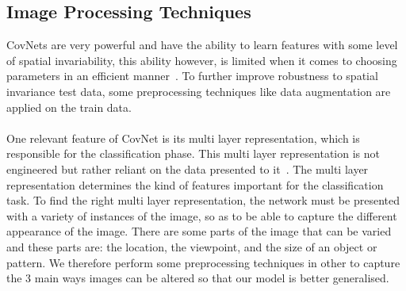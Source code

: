 \documentclass[12pt, a4paper,oneside]{report}
\begin{document}
\subsection{Image Processing Techniques}
CovNets are very powerful and have the ability to learn features with some level of spatial invariability, this ability however, is limited when it comes to choosing parameters in an efficient manner~\cite{jaderberg2015spatial}. To further improve robustness to spatial invariance test data, some preprocessing techniques like data augmentation are applied on the train data.\\ \\ One relevant feature of CovNet is its multi layer representation, which is responsible for the classification phase. This multi layer representation is not engineered but rather reliant on the data presented to it~\cite{van2017learning}. The multi layer representation determines the kind of features important for the classification task. To find the right multi layer representation, the network must be presented with a variety of instances of the image, so as to be able to capture the different appearance of the image. There are some parts of the image that can be varied and these parts are: the location, the viewpoint, and the size of an object or pattern. We therefore perform some preprocessing techniques in other to capture the 3 main ways images can be altered so that our model is better generalised. 
\end{document}
